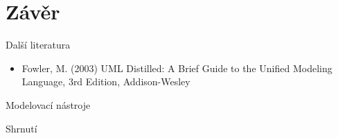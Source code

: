 \section{Závěr}



\begin{frame}{Další literatura}

\begin{itemize}
	\item Fowler, M. (2003) UML Distilled: A Brief Guide to the Unified Modeling Language, 3rd Edition,
  Addison-Wesley
\end{itemize}



\end{frame}


\begin{frame}{Modelovací nástroje}



\end{frame}


\begin{frame}{Shrnutí}



\end{frame}

